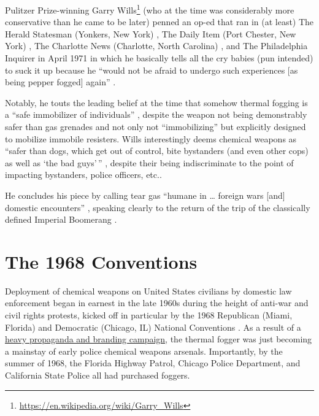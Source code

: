 \documentclass[
  11pt,
]{krantz}
\renewcommand{\href}[2]{#2\footnote{\url{#1}}}
\begin{document}
Pulitzer Prize-winning \href{https://en.wikipedia.org/wiki/Garry_Wills}{Garry Wills} (who at the time was considerably more conservative than he came to be later) penned an op-ed that ran in (at least) The Herald Statesman (Yonkers, New York) \citep{Wills1971a}, The Daily Item (Port Chester, New York) \citep{Wills1971b}, The Charlotte News (Charlotte, North Carolina) \citep{Wills1971c}, and The Philadelphia Inquirer \citep{Wills1971d} in April 1971 in which he basically tells all the cry babies (pun intended) to suck it up because he ``would not be afraid to undergo such experiences {[}as being pepper fogged{]} again'' \citep{Wills1971a}.

Notably, he touts the leading belief at the time that somehow thermal fogging is a ``safe immobilizer of individuals'' \citep{Wills1971a}, despite the weapon not being demonstrably safer than gas grenades and not only not ``immobilizing'' but explicitly designed to mobilize immobile resisters.
Wills interestingly deems chemical weapons as ``safer than dogs, which get out of control, bite bystanders (and even other cops) as well as `the bad guys'\,'' \citep{Wills1971a}, despite their being indiscriminate to the point of impacting bystanders, police officers, etc..

He concludes his piece by calling tear gas ``humane in \ldots{} foreign wars {[}and{]} domestic encounters'' \citep{Wills1971a}, speaking clearly to the return of the trip of the classically defined Imperial Boomerang \citep{Cesaire1950, Arendt1951, Foucault1976}.

\hypertarget{The1968Conventions}{%
\chapter*{The 1968 Conventions}\label{The1968Conventions}}


Deployment of chemical weapons on United States civilians by domestic law enforcement began in earnest in the late 1960s during the height of anti-war and civil rights protests, kicked off in particular by the 1968 Republican (Miami, Florida) and Democratic (Chicago, IL) National Conventions \citep{McArdle2018, TaylorandMorris2018}.
As a result of a \protect\hyperlink{TheReturn}{heavy propaganda and branding campaign}, the thermal fogger was just becoming a mainstay of early police chemical weapons arsenals.
Importantly, by the summer of 1968, the Florida Highway Patrol, Chicago Police Department, and California State Police all had purchased foggers.
\end{document}
